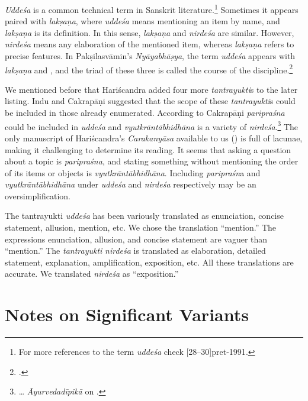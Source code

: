 \emph{Uddeśa} is a common technical term in Sanskrit literature.\footnote{%
	For more references to the term \emph{uddeśa} check [28--30]{pret-1991}.} 
Sometimes it appears paired with \emph{lakṣaṇa}, 
where \emph{uddeśa} means mentioning an item by name,
and \emph{lakṣaṇa} is its definition. 
In this sense, \emph{lakṣaṇa} and \emph{nirdeśa} are similar. 
However, \emph{nirdeśa} means any elaboration of the mentioned item, 
whereas \emph{lakṣaṇa} refers to precise features. 
In Pakṣilasvāmin's \emph{Nyāyabhāṣya}, the term \emph{uddeśa} appears with 
\emph{lakṣaṇa} and , 
and the triad of these three is called the course of the discipline.\footnote{%
		\cite[14]{josh-1922}.}
	
We mentioned before that Hariścandra added four more \emph{tantrayukti}s to the later listing. 
Indu and Cakrapāṇi suggested that 
the scope of these \emph{tantrayukti}s could be included in those already enumerated. 
According to Cakrapāṇi \emph{paripraśna} could be included in \emph{uddeśa} 
and \emph{vyutkrāntābhidhāna} is a variety of \emph{nirdeśa}.\footnote{%
	\ldots
	\emph{Āyurvedadīpikā} on .} 
The only manuscript of Hariścandra's \emph{Carakanyāsa} available to us () 
is full of lacunae, making it challenging to determine its reading. 
It seems that asking a question about a topic is \emph{paripraśna}, 
and stating something without mentioning the order of its items or objects is \emph{vyutkrāntābhidhāna}. 
Including \emph{paripraśn}a and \emph{vyutkrāntābhidhāna} under 
\emph{uddeśa} and \emph{nirdeśa} respectively may be an oversimplification.

The tantrayukti \emph{uddeśa} has been variously translated as 
enunciation, concise statement, allusion, mention, etc. 
We chose the translation “mention.” 
The expressions enunciation, allusion, and concise statement are vaguer than “mention.” 
The \emph{tantrayukti} \emph{nirdeśa} is translated as 
elaboration, detailed statement, explanation, amplification, exposition, etc. 
All these translations are accurate. 
We translated \emph{nirdeśa} as “exposition.”

\section{Notes on Significant Variants}

